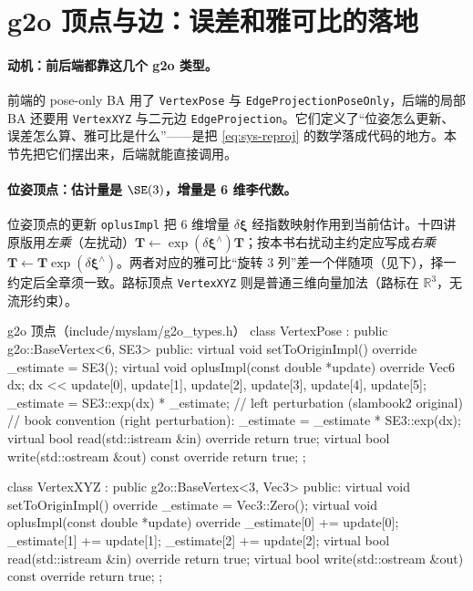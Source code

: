 \section{g2o 顶点与边：误差和雅可比的落地}
\label{sec:sys-jacobian}

\paragraph{动机：前后端都靠这几个 g2o 类型。}
前端的 pose-only BA 用了 \texttt{VertexPose} 与 \texttt{EdgeProjectionPoseOnly}，后端的局部 BA 还要用 \texttt{VertexXYZ} 与二元边 \texttt{EdgeProjection}。它们定义了“位姿怎么更新、误差怎么算、雅可比是什么”——是把 \cref{eq:sys-reproj} 的数学落成代码的地方。本节先把它们摆出来，后端就能直接调用。

\paragraph{位姿顶点：估计量是 $\SE(3)$，增量是 6 维李代数。}
位姿顶点的更新 \texttt{oplusImpl} 把 6 维增量 $\delta\boldsymbol\xi$ 经指数映射作用到当前估计。十四讲原版用\emph{左乘}（左扰动）$\mathbf{T}\leftarrow\exp(\delta\boldsymbol\xi^\wedge)\mathbf{T}$；按本书右扰动主约定应写成\emph{右乘} $\mathbf{T}\leftarrow\mathbf{T}\exp(\delta\boldsymbol\xi^\wedge)$。两者对应的雅可比“旋转 3 列”差一个伴随项（见下），择一约定后全章须一致。路标顶点 \texttt{VertexXYZ} 则是普通三维向量加法（路标在 $\mathbb{R}^3$，无流形约束）。

\begin{codebox}[C++]{g2o 顶点（include/myslam/g2o\_types.h）}
class VertexPose : public g2o::BaseVertex<6, SE3> {
   public:
    virtual void setToOriginImpl() override { _estimate = SE3(); }
    virtual void oplusImpl(const double *update) override {
        Vec6 dx;
        dx << update[0], update[1], update[2], update[3], update[4], update[5];
        _estimate = SE3::exp(dx) * _estimate;     // left perturbation (slambook2 original)
        // book convention (right perturbation): _estimate = _estimate * SE3::exp(dx);
    }
    virtual bool read(std::istream &in) override  { return true; }
    virtual bool write(std::ostream &out) const override { return true; }
};

class VertexXYZ : public g2o::BaseVertex<3, Vec3> {
   public:
    virtual void setToOriginImpl() override { _estimate = Vec3::Zero(); }
    virtual void oplusImpl(const double *update) override {
        _estimate[0] += update[0]; _estimate[1] += update[1]; _estimate[2] += update[2];
    }
    virtual bool read(std::istream &in) override  { return true; }
    virtual bool write(std::ostream &out) const override { return true; }
};
\end{codebox}

